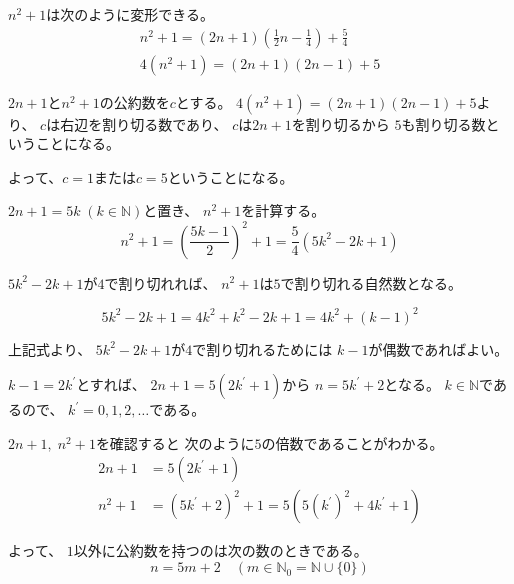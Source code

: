 \documentclass[12pt,b5paper]{ltjsarticle}
\begin{document}
\begin{enumerate}
      $n^{2}+1$は次のように変形できる。
      \begin{gather}
       n^{2}+1
        = \left( 2n+1 \right) \left( \frac{1}{2}n-\frac{1}{4} \right) +\frac{5}{4}\\
       4(n^{2}+1)
       = ( 2n+1 ) ( 2n-1 ) +5
      \end{gather}

      $2n+1$と$n^{2}+1$の公約数を$c$とする。
      $4(n^{2}+1)=( 2n+1 ) ( 2n-1 ) +5$より、
      $c$は右辺を割り切る数であり、
      $c$は$2n+1$を割り切るから
      $5$も割り切る数ということになる。

      よって、$c=1$または$c=5$ということになる。

      $2n+1 =5k \; (k\in\mathbb{N})$と置き、
      $n^{2}+1$を計算する。
      \begin{equation}
       n^{2}+1
        = \left( \frac{5k-1}{2} \right)^{2}+1
        = \frac{5}{4}(5k^{2}-2k+1)
      \end{equation}

      $5k^{2}-2k+1$が$4$で割り切れれば、
      $n^{2}+1$は$5$で割り切れる自然数となる。

      \begin{equation}
       5k^{2}-2k+1
        =4k^{2} + k^{2}-2k+1
        =4k^{2} + (k-1)^{2}
      \end{equation}

      上記式より、
      $5k^{2}-2k+1$が$4$で割り切れるためには
      $k-1$が偶数であればよい。

      $k-1=2k^{\prime}$とすれば、
      $2n+1=5(2k^{\prime}+1)$から
      $n=5k^{\prime} + 2$となる。
      $k\in\mathbb{N}$であるので、
      $k^{\prime}=0,1,2,\dots$である。

      $2n+1,\; n^{2}+1$を確認すると
      次のように$5$の倍数であることがわかる。
      \begin{align}
       2n+1 &= 5(2k^{\prime} +1)\\
       n^{2}+1 &= (5k^{\prime}+2)^{2}+1
       = 5( 5(k^{\prime})^{2} +4k^{\prime} +1)
      \end{align}

      よって、
      $1$以外に公約数を持つのは次の数のときである。
      \begin{equation}
       n= 5m +2 \quad (m\in\mathbb{N}_{0}=\mathbb{N} \cup  \{0\})
      \end{equation}


      \hrulefill

\end{enumerate}


\hrulefill
\end{document}
